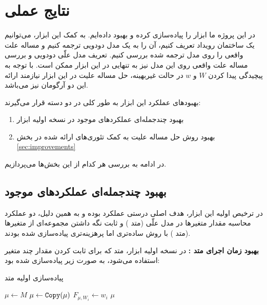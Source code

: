\section{نتایج عملی}\label{sec:experiments}

در این پروژه ما ابزار
را پیاده‌سازی کرده و بهبود داده‌ایم.
به کمک این ابزار، می‌توانیم یک ساختمان رویداد تعریف کنیم،
آن را به یک مدل دودویی ترجمه کنیم
و مساله علت واقعی را روی مدل ترجمه شده بررسی کنیم.
تعریف مدل علّی دودویی و بررسی مساله علت واقعی 
روی این مدل نیز به تنهایی در این ابزار ممکن است.
با توجه به پیچیدگی پیدا کردن
$W$ و $w$
در حالت غیربهینه، حل مساله علیت در این ابزار
نیازمند ارائه این دو آرگومان نیز می‌باشد.

بهبودهای عملکرد این ابزار به طور کلی
در دو دسته قرار می‌گیرند:

\begin{enumerate}
  \item
    بهبود چندجمله‌ای عملکردهای موجود
    در نسخه اولیه ابزار
  \item
    بهبود روش حل مساله علیت
    به کمک تئوری‌های ارائه شده در بخش
    \ref{sec:improvements}
\end{enumerate}

در ادامه به بررسی هر کدام از این بخش‌ها می‌پردازیم.

\subsection{بهبود چندجمله‌ای عملکردهای موجود}

در ترخیص
اولیه این ابزار،
هدف اصلی درستی عملکرد بوده و به همین دلیل،
دو عملکرد محاسبه مقدار متغیرها در مدل علّی
(متد )
و ثابت نگه داشتن مجموعه‌ای از متغیرها
(متد )
با روش ساده‌تری اما پرهزینه‌تری پیاده‌سازی شده بودند.

\textbf{بهبود زمان اجرای متد
:}
در نسخه اولیه ابزار، متد
که برای ثابت کردن مقدار چند متغیر استفاده می‌شود،
به صورت زیر پیاده‌سازی شده بود:

\begin{algorithm}
  \caption{پیاده‌سازی اولیه متد
  }
  \begin{latin}
  \begin{algorithmic}[1]
    \State $\mu \gets M$
      \State $\mu \gets \operatorname{\texttt{Copy}}(\mu)$
      \State $F_{\mu,W_i} \gets w_i$
    \EndFor
    \State \Return $\mu$
  \end{algorithmic}
  \end{latin}
\end{algorithm}


